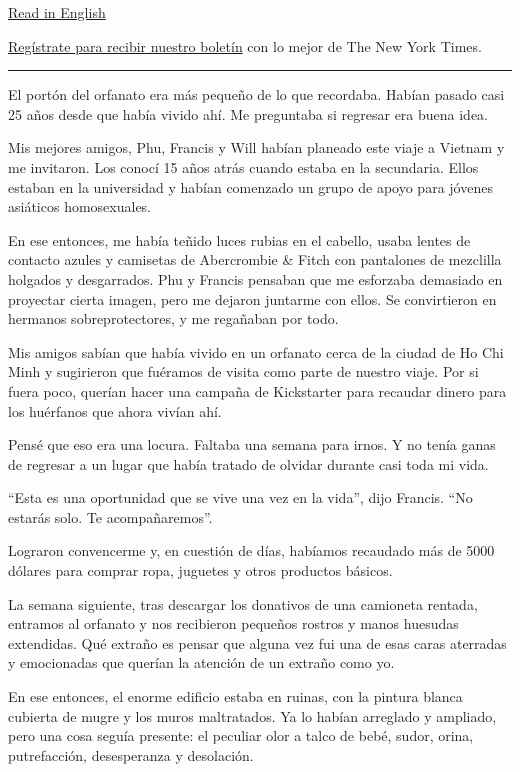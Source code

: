 \href{https://www.nytimes.com/2020/07/24/style/modern-love-adoption-vietnam-why-did-she-leave-me-there.html}{Read
in English}

\href{https://www.nytimes.com/newsletters/el-times}{Regístrate para
recibir nuestro boletín} con lo mejor de The New York Times.

\begin{center}\rule{0.5\linewidth}{\linethickness}\end{center}

El portón del orfanato era más pequeño de lo que recordaba. Habían
pasado casi 25 años desde que había vivido ahí. Me preguntaba si
regresar era buena idea.

Mis mejores amigos, Phu, Francis y Will habían planeado este viaje a
Vietnam y me invitaron. Los conocí 15 años atrás cuando estaba en la
secundaria. Ellos estaban en la universidad y habían comenzado un grupo
de apoyo para jóvenes asiáticos homosexuales.

En ese entonces, me había teñido luces rubias en el cabello, usaba
lentes de contacto azules y camisetas de Abercrombie \& Fitch con
pantalones de mezclilla holgados y desgarrados. Phu y Francis pensaban
que me esforzaba demasiado en proyectar cierta imagen, pero me dejaron
juntarme con ellos. Se convirtieron en hermanos sobreprotectores, y me
regañaban por todo.

Mis amigos sabían que había vivido en un orfanato cerca de la ciudad de
Ho Chi Minh y sugirieron que fuéramos de visita como parte de nuestro
viaje. Por si fuera poco, querían hacer una campaña de Kickstarter para
recaudar dinero para los huérfanos que ahora vivían ahí.

Pensé que eso era una locura. Faltaba una semana para irnos. Y no tenía
ganas de regresar a un lugar que había tratado de olvidar durante casi
toda mi vida.

``Esta es una oportunidad que se vive una vez en la vida'', dijo
Francis. ``No estarás solo. Te acompañaremos''.

Lograron convencerme y, en cuestión de días, habíamos recaudado más de
5000 dólares para comprar ropa, juguetes y otros productos básicos.

La semana siguiente, tras descargar los donativos de una camioneta
rentada, entramos al orfanato y nos recibieron pequeños rostros y manos
huesudas extendidas. Qué extraño es pensar que alguna vez fui una de
esas caras aterradas y emocionadas que querían la atención de un extraño
como yo.

En ese entonces, el enorme edificio estaba en ruinas, con la pintura
blanca cubierta de mugre y los muros maltratados. Ya lo habían arreglado
y ampliado, pero una cosa seguía presente: el peculiar olor a talco de
bebé, sudor, orina, putrefacción, desesperanza y desolación.

